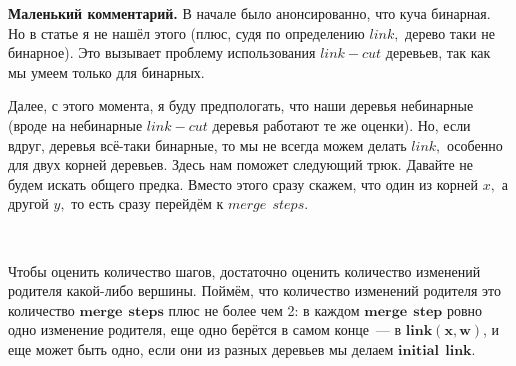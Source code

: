 \textbf{Маленький комментарий.} В начале было анонсированно, что куча бинарная. Но в статье я не нашёл этого (плюс, судя по определению $link,$ дерево таки не бинарное). Это вызывает проблему использования $link-cut$ деревьев, так как мы умеем только для бинарных.

Далее, с этого момента, я буду предпологать, что наши деревья небинарные (вроде на небинарные $link-cut$ деревья работают те же оценки). Но, если вдруг, деревья всё-таки бинарные, то мы не всегда можем делать $link,$ особенно для двух корней деревьев. Здесь нам поможет следующий трюк. Давайте не будем искать общего предка. Вместо этого сразу скажем, что один из корней $x,$ а другой $y,$ то есть сразу перейдём к $merge\:\:steps.$\label{trick}

$\quad$

Чтобы оценить количество шагов, достаточно оценить количество изменений родителя какой-либо вершины. Поймём, что количество изменений родителя это количество $\mathbf{merge\:\:steps}$ плюс не более чем 2: в каждом $\mathbf{merge\:\:step}$ ровно одно изменение родителя, еще одно берётся в самом конце~--- в $\mathbf{link(x, w)}$, и еще может быть одно, если они из разных деревьев мы делаем $\mathbf{initial\:\:link}$.


